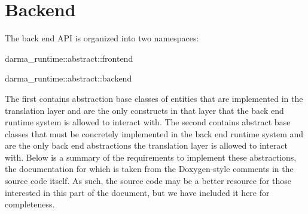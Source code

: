 
\chapter{Backend}
\label{chap:back_end}

The \gls{back end} \gls{API} is organized into two namespaces:
\begin{compactenum}
\item {\ttfamily darma\_runtime::abstract::frontend} 
\item {\ttfamily darma\_runtime::abstract::backend}  
\end{compactenum}

The first contains
abstraction base classes of entities that are implemented in the \gls{translation
layer} and are the only constructs in that layer that the \gls{back end}
\gls{runtime system} is
allowed to interact with.  The second contains abstract base classes that must
be concretely implemented in the \gls{back end} \gls{runtime system} and
are the only \gls{back end} abstractions the \gls{translation layer} is allowed to interact
with.  Below is a summary of the requirements to implement these abstractions,
the documentation for which is taken from the Doxygen-style comments in
the source code itself.  As such, the source code may be a better resource for
those interested in this part of the document, but we have included it here for
completeness. 

